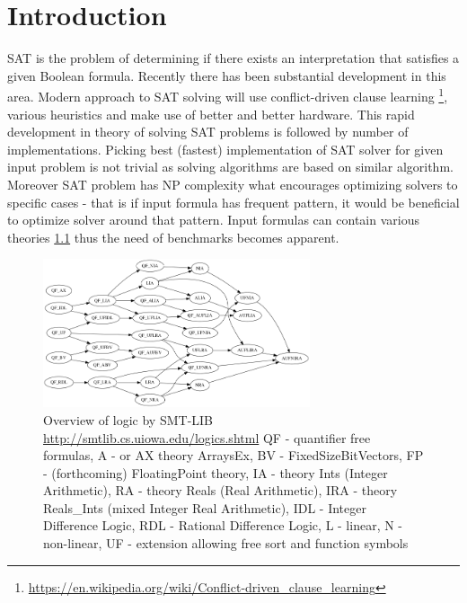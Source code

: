 \chapter{Introduction}
\label{cha:Introduction}

\gls{SAT} is the problem of determining if there exists an interpretation that satisfies a given Boolean formula. Recently there has been substantial development in this area. Modern approach to SAT solving will use conflict-driven clause learning \footnote{\url{https://en.wikipedia.org/wiki/Conflict-driven_clause_learning}}, various heuristics and make use of better and better hardware. This rapid development in theory of solving SAT problems is followed by number of implementations. Picking best (fastest) implementation of SAT solver for given input problem is not trivial as solving algorithms are based on similar algorithm. Moreover SAT problem has NP complexity what encourages optimizing solvers to specific cases - that is if input formula has frequent pattern, it would be beneficial to optimize solver around that pattern. Input formulas can contain various theories \ref{pic:logicOverview} thus the need of benchmarks becomes apparent.

\begin{figure}[h]
\begin{centering}
  \includegraphics[width=0.7\textwidth]{images/smt_lib_logics.png}
  \caption{Overview of logic by SMT-LIB \url{http://smtlib.cs.uiowa.edu/logics.shtml} 
    \tiny{QF - quantifier free formulas,
    A - or AX theory ArraysEx,
    BV - FixedSizeBitVectors,
    FP - (forthcoming) FloatingPoint theory,
    IA - theory Ints (Integer Arithmetic),
    RA - theory Reals (Real Arithmetic),
    IRA - theory Reals\_Ints (mixed Integer Real Arithmetic),
    IDL - Integer Difference Logic,
    RDL - Rational Difference Logic,
    L - linear,
    N - non-linear,
    UF - extension allowing free sort and function symbols
  }}
  \label{pic:logicOverview}
\end{centering}
\end{figure}

